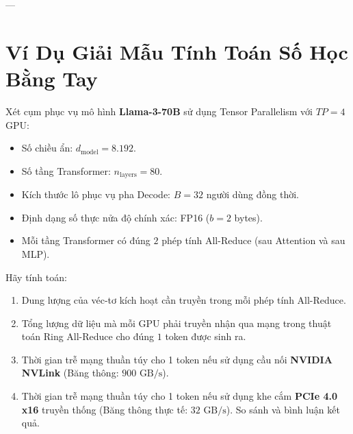 ---

\section{Ví Dụ Giải Mẫu Tính Toán Số Học Bằng Tay}
\label{sec:serving-worked-examples}

\begin{example}
Xét cụm phục vụ mô hình \textbf{Llama-3-70B} sử dụng Tensor Parallelism với $TP = 4$ GPU:
\begin{itemize}
  \item Số chiều ẩn: $d_{\text{model}} = 8.192$.
  \item Số tầng Transformer: $n_{\text{layers}} = 80$.
  \item Kích thước lô phục vụ pha Decode: $B = 32$ người dùng đồng thời.
  \item Định dạng số thực nửa độ chính xác: FP16 ($b = 2$ bytes).
  \item Mỗi tầng Transformer có đúng $2$ phép tính All-Reduce (sau Attention và sau MLP).
\end{itemize}

Hãy tính toán:
\begin{enumerate}
  \item Dung lượng của véc-tơ kích hoạt cần truyền trong mỗi phép tính All-Reduce.
  \item Tổng lượng dữ liệu mà mỗi GPU phải truyền nhận qua mạng trong thuật toán Ring All-Reduce cho đúng $1$ token được sinh ra.
  \item Thời gian trễ mạng thuần túy cho 1 token nếu sử dụng cầu nối \textbf{NVIDIA NVLink} (Băng thông: $900\text{ GB/s}$).
  \item Thời gian trễ mạng thuần túy cho 1 token nếu sử dụng khe cắm \textbf{PCIe 4.0 x16} truyền thống (Băng thông thực tế: $32\text{ GB/s}$). So sánh và bình luận kết quả.
\end{enumerate}
\end{example}

